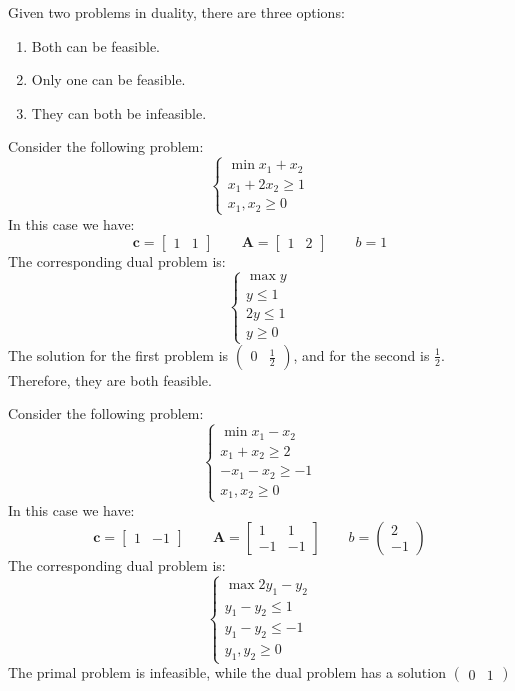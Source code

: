 Given two problems in duality, there are three options: 
\begin{enumerate}
    \item Both can be feasible.
    \item Only one can be feasible. 
    \item They can both be infeasible.
\end{enumerate}
\begin{example}
    Consider the following problem: 
    \[\begin{cases}
        \min x_1+x_2 \\
        x_1+2x_2\geq 1 \\
        x_1,x_2 \geq 0
    \end{cases}\]
    In this case we have: 
    \[\mathbf{c}=\begin{bmatrix} 1 & 1 \end{bmatrix} \qquad \mathbf{A}=\begin{bmatrix} 1 & 2 \end{bmatrix} \qquad b=1\]
    The corresponding dual problem is: 
    \[\begin{cases}
        \max y \\
        y \leq 1 \\
        2y \leq 1 \\
        y \geq 0
    \end{cases}\]
    The solution for the first problem is $\begin{pmatrix} 0 & \frac{1}{2} \end{pmatrix}$, and for the second is $\frac{1}{2}$. 
    Therefore, they are both feasible. 
\end{example}
\begin{example}
    Consider the following problem: 
    \[\begin{cases}
        \min x_1-x_2 \\
        x_1+x_2 \geq 2 \\
        -x_1-x_2 \geq -1 \\
        x_1,x_2 \geq 0
    \end{cases}\]
    In this case we have: 
    \[\mathbf{c}=\begin{bmatrix} 1 & -1 \end{bmatrix} \qquad \mathbf{A}=\begin{bmatrix} 1 & 1 \\ -1 & -1 \end{bmatrix} \qquad b=\begin{pmatrix} 2 \\ -1 \end{pmatrix}\]
    The corresponding dual problem is: 
    \[\begin{cases}
        \max 2y_1-y_2 \\
        y_1-y_2 \leq 1 \\
        y_1-y_2 \leq -1 \\
        y_1,y_2 \geq 0
    \end{cases}\]
    The primal problem is infeasible, while the dual problem has a solution $\begin{pmatrix} 0 & 1 \end{pmatrix}$
\end{example}


